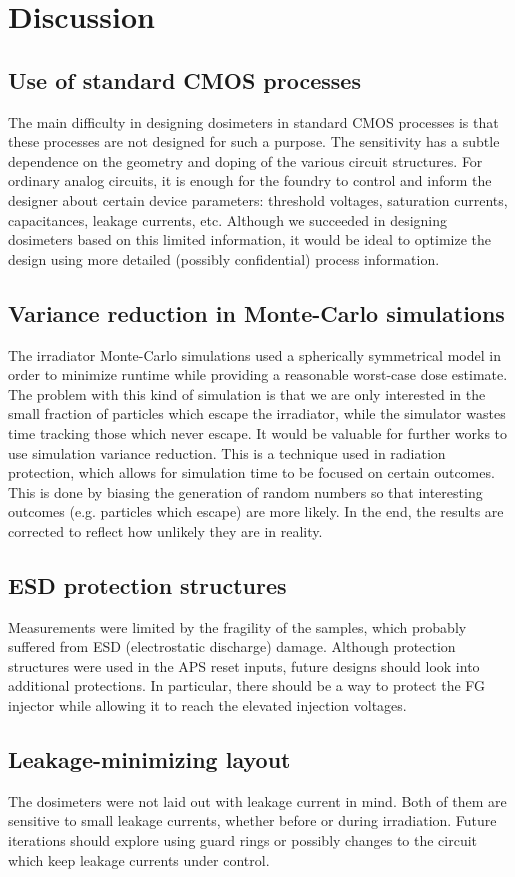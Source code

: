 \section{Discussion}
\subsection{Use of standard CMOS processes}
The main difficulty in designing dosimeters in standard CMOS processes
is that these processes are not designed for such a purpose.
The sensitivity has a subtle dependence on the geometry and doping of the
various circuit structures.
For ordinary analog circuits, it is enough for the foundry to control and inform the designer about
certain device parameters: threshold voltages, saturation currents, capacitances, leakage currents, etc.
Although we succeeded in designing dosimeters based on this limited information,
it would be ideal to optimize the design using more detailed 
(possibly confidential) process information.
\subsection{Variance reduction in Monte-Carlo simulations}
The irradiator Monte-Carlo simulations used a spherically symmetrical model
in order to minimize runtime while providing a reasonable worst-case dose estimate.
The problem with this kind of simulation is that we are only interested in 
the small fraction of particles which escape the irradiator,
while the simulator wastes time tracking those which never escape.
It would be valuable for further works to use simulation variance reduction.
This is a technique used in radiation protection,
which allows for simulation time to be focused on certain outcomes.
This is done by biasing the generation of random numbers so that interesting outcomes
(e.g. particles which escape) are more likely.
In the end, the results are corrected to reflect how unlikely they are in reality.
\subsection{ESD protection structures}
Measurements were limited by the fragility of the samples,
which probably suffered from ESD (electrostatic discharge) damage.
Although protection structures were used in the APS reset inputs,
future designs should look into additional protections.
In particular, there should be a way to protect the FG injector
while allowing it to reach the elevated injection voltages.
\subsection{Leakage-minimizing layout}
The dosimeters were not laid out with leakage current in mind.
Both of them are sensitive to small leakage currents, whether before or during irradiation.
Future iterations should explore using guard rings or possibly changes to the circuit
which keep leakage currents under control.
